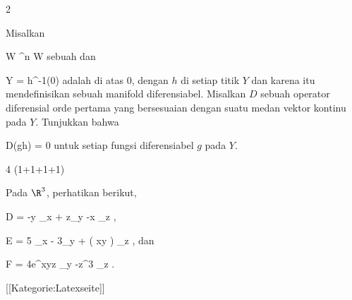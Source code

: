 {2}
{

Misalkan

\mavergleichskette
{\vergleichskette
{ W
}
{ \subseteq }{ \R^n
}
{  }{
}
{    }{
}
{   }{
}
}
{}{}{}
 { W } { \R
} {}
sebuah
dan

\mavergleichskette
{\vergleichskette
{ Y
}
{ = }{ h^{-1}(0)
}
{  }{
}
{    }{
}
{   }{
}
}
{}{}{}
adalah
di atas $0$, dengan $h$
di setiap titik $Y$ dan karena itu mendefinisikan sebuah manifold diferensiabel. Misalkan $D$ sebuah operator diferensial orde pertama yang bersesuaian dengan suatu medan vektor kontinu pada $Y$. Tunjukkan bahwa

\mavergleichskettedisp
{\vergleichskette
{ D(gh)
}
{ =} { 0
}
{ } {
}
{ } {
}
{ } {
}
}
{}{}{}
untuk setiap fungsi diferensiabel $g$ pada $Y$.

}
{} {}

{4 (1+1+1+1)}
{

Pada $\R^3$, perhatikan
berikut,

\mavergleichskettedisp
{\vergleichskette
{ D
}
{ =} { -y \partial_x  + z\partial_y -x \partial_z
}
{ } {
}
{ } {
}
{ } {
}
}
{}{}{,}

\mavergleichskettedisp
{\vergleichskette
{ E
}
{ =} { 5 \partial_x - 3\partial_y +  \cos \left(  xy \right)  \partial_z
}
{ } {
}
{ } {
}
{ } {
}
}
{}{}{,}
dan

\mavergleichskettedisp
{\vergleichskette
{ F
}
{ =} { 4e^{xyz} \partial_y -z^3 \partial_z
}
{ } {
}
{ } {
}
{ } {
}
}
{}{}{.}

}
{} {}

 [[Kategorie:Latexseite]]
